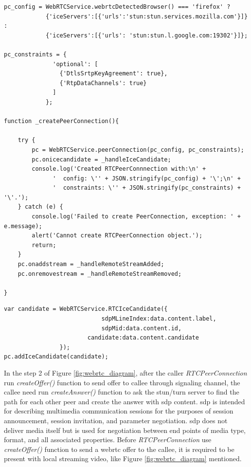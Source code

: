 \begin{lstlisting}[caption={Create Peer Connection function},label={code:create_peer_connection}]
pc_config = WebRTCService.webrtcDetectedBrowser() === 'firefox' ?
  			{'iceServers':[{'urls':'stun:stun.services.mozilla.com'}]} :
  			{'iceServers':[{'urls': 'stun:stun.l.google.com:19302'}]};

pc_constraints = {
			  'optional': [
			    {'DtlsSrtpKeyAgreement': true},
			    {'RtpDataChannels': true}
			  ]
			};
			
function _createPeerConnection(){

	try {
		pc = WebRTCService.peerConnection(pc_config, pc_constraints);
		pc.onicecandidate = _handleIceCandidate;
		console.log('Created RTCPeerConnnection with:\n' +
		      '  config: \'' + JSON.stringify(pc_config) + '\';\n' +
		      '  constraints: \'' + JSON.stringify(pc_constraints) + '\'.');
	} catch (e) {
		console.log('Failed to create PeerConnection, exception: ' + e.message);
		alert('Cannot create RTCPeerConnection object.');
		return;
	}
	pc.onaddstream = _handleRemoteStreamAdded;
	pc.onremovestream = _handleRemoteStreamRemoved;

}
\end{lstlisting}

\begin{lstlisting}[caption={Add Remote IceCandidate function},label={code:add_remote_ice}]
var candidate = WebRTCService.RTCIceCandidate({
					    	sdpMLineIndex:data.content.label,
					    	sdpMid:data.content.id,
					    candidate:data.content.candidate
				});
pc.addIceCandidate(candidate);

\end{lstlisting}

\par In the step 2 of Figure \ref{fig:webrtc_diagram}, after the caller \textit{RTCPeerConnection} run \textit{createOffer()} function to send offer to callee through signaling channel, the callee need run \textit{createAnswer()} function to ask the \gls{stun}/\gls{turn} server to find the path for each other peer and create the answer with \gls{sdp} content. \gls{sdp} is intended for describing multimedia communication sessions for the purposes of session announcement, session invitation, and parameter negotiation. \gls{sdp} does not deliver media itself but is used for negotiation between end points of media type, format, and all associated properties.\cite{wiki:sdp} Before \textit{RTCPeerConnection} use \textit{createOffer()} function to send a \gls{webrtc} offer to the callee, it is required to be present with local streaming video, like Figure \ref{fig:webrtc_diagram} mentioned.

